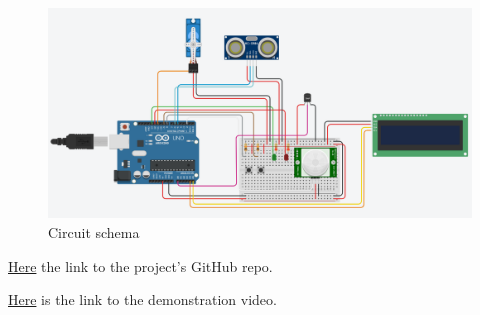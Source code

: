 \documentclass[a4paper,12pt]{report}
\begin{document}
    \begin{figure}[H]
        \centering{}
            \includegraphics[width=\textwidth]{img/Assignment-02_SWDS-Schema.png}
        \caption{Circuit schema}
        \label{img:schema}
    \end{figure}
    
    \centerline{\href{https://github.com/Sansalina/IoT-assignment-02}{Here} the link to the project's GitHub repo.}
    \centerline{\href{https://drive.google.com/file/d/1d6b1z2RUoSSoMtx6eu3L8nykpJ6HNov7/view?usp=drive_link}{Here} is the link to the demonstration video.}
\end{document}

